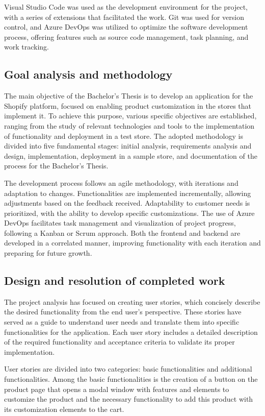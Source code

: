\documentclass[11pt]{article}
\begin{document}
Visual Studio Code was used as the development environment for the project, with a series of extensions that facilitated the work. Git was 
used for version control, and Azure DevOps was utilized to optimize the software development process, offering features such as source code 
management, task planning, and work tracking.

\subsection{Goal analysis and methodology}
The main objective of the Bachelor's Thesis is to develop an application for the Shopify platform, focused on enabling product customization
in the stores that implement it. To achieve this purpose, various specific objectives are established, ranging from the study of relevant technologies
and tools to the implementation of functionality and deployment in a test store. The adopted methodology is divided into five 
fundamental stages: initial analysis, requirements analysis and design, implementation, deployment in a sample store, and documentation of the process for the Bachelor's Thesis.

The development process follows an agile methodology, with iterations and adaptation to changes. Functionalities are implemented incrementally,
allowing adjustments based on the feedback received. Adaptability to customer needs is prioritized, with the ability to develop specific customizations.
The use of Azure DevOps facilitates task management and visualization of project progress, following a Kanban or Scrum approach. Both the frontend 
and backend are developed in a correlated manner, improving functionality with each iteration and preparing for future growth.

\subsection{Design and resolution of completed work }
The project analysis has focused on creating user stories, which concisely describe the desired functionality from the end user's perspective.
These stories have served as a guide to understand user needs and translate them into specific functionalities for the application. 
Each user story includes a detailed description of the required functionality and acceptance criteria to validate its proper implementation.

User stories are divided into two categories: basic functionalities and additional functionalities. Among the basic functionalities is 
the creation of a button on the product page that opens a modal window with features and elements to customize the product and the necessary
functionality to add this product with its customization elements to the cart.
\end{document}
